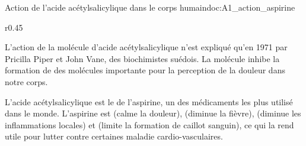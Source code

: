 \begin{doc}{Action de l'acide acétylsalicylique dans le corps humain}{doc:A1_action_aspirine}
  \begin{wrapfigure}[10]{r}{0.45\linewidth}
    \vspace*{-12pt}
    \centering 
    \smallskip

  \end{wrapfigure}
  L'action de la molécule d'acide acétylsalicylique n'est expliqué qu'en 1971 par Pricilla Piper et John Vane, des biochimistes suédois.
  La molécule inhibe la formation de  des molécules importante pour la perception de la douleur dans notre corps.

  L'acide acétylsalicylique est le  de l'aspirine, un des médicaments les plus utilisé dans le monde.
  L'aspirine est  (calme la douleur),  (diminue la fièvre),  (diminue les inflammations locales) et  (limite la formation de caillot sanguin), ce qui la rend utile pour lutter contre certaines maladie cardio-vasculaires.
\end{doc}


